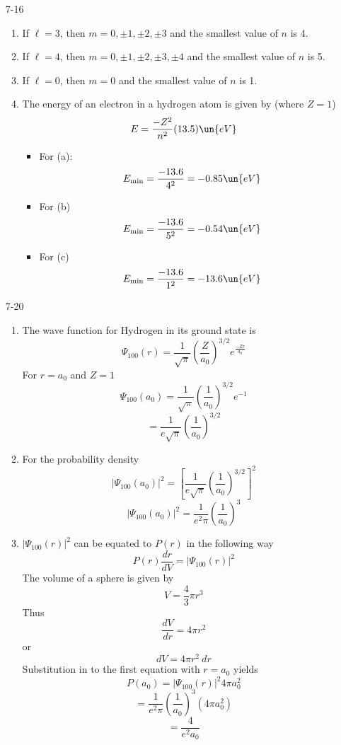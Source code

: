 \documentclass[]{2620hw}
\begin{document}
\begin{enumerate}
\item [7-16]
\begin{enumerate}
	\item If $\ell = 3$, then $m = 0, \pm 1, \pm 2, \pm 3$ and the smallest value of $n$ is 4.
	\item If $\ell = 4$, then $m = 0, \pm 1, \pm 2, \pm 3, \pm 4$ and the smallest value of $n$ is 5.
	\item If $\ell = 0$, then $m = 0$ and the smallest value of $n$ is 1.
	\item The energy of an electron in a hydrogen atom is given by (where $Z = 1$)
	\[
		E = \frac{-Z^2}{n^2}(13.5)\un{eV}
	\]
	\begin{itemize} 
		\item For (a):
		\[
			E_{\text{min}} = \frac{-13.6}{4^2} = -0.85 \un{eV}
		\]
		\item For (b)
		\[
			E_{\text{min}} = \frac{-13.6}{5^2} = -0.54 \un{eV}
		\]
		\item For (c)
		\[
			E_{\text{min}} = \frac{-13.6}{1^2} = -13.6 \un{eV}
		\]
	\end{itemize}
\end{enumerate}

\item [7-20]
\begin{enumerate}
	\item The wave function for Hydrogen in its ground state is
	\[
		\Psi_{100}(r) = \frac{1}{\sqrt{\pi}} \left( \frac{Z}{a_0} \right)^{3/2}e^{\frac{-Zr}{a_0}}
	\]
	For $r = a_0$ and $Z = 1$
	\[
		\Psi_{100}(a_0) = \frac{1}{\sqrt{\pi}} \left( \frac{1}{a_0} \right)^{3/2}e^{-1}
	\]
	\[
		=\frac{1}{e\sqrt{\pi}} \left( \frac{1}{a_0} \right)^{3/2}
	\]
	\item For the probability density 
	\[
		|\Psi_{100}(a_0)|^2 = \left [ \frac{1}{e\sqrt{\pi}} \left( \frac{1}{a_0} \right)^{3/2} \right]^2
	\]
	\[
		|\Psi_{100}(a_0)|^2 = \frac{1}{e^2\pi} \left( \frac{1}{a_0} \right)^3
	\]
	\item $|\Psi_{100}(r)|^2$ can be equated to $P(r)$ in the following way 
	\[
		P(r) \frac{dr}{dV} = |\Psi_{100}(r)|^2 
	\]
	The volume of a sphere is given by
	\[
		V = \frac{4}{3}\pi r^3
	\]
	Thus 
	\[
		\frac{dV}{dr} = 4\pi r^2
	\]
	or 
	\[
		dV = 4\pi r^2 \: dr
	\]
	Substitution in to the first equation with $r = a_0$ yields 
	\[
		P(a_0) = |\Psi_{100}(r)|^2 4\pi a_0^2
	\]
	\[
		= \frac{1}{e^2\pi} \left( \frac{1}{a_0} \right)^3 ( 4\pi a_0^2)
	\]
	\[
		= \frac{4}{e^2a_0}
	\]
\end{enumerate}


\end{enumerate}
\end{document}
